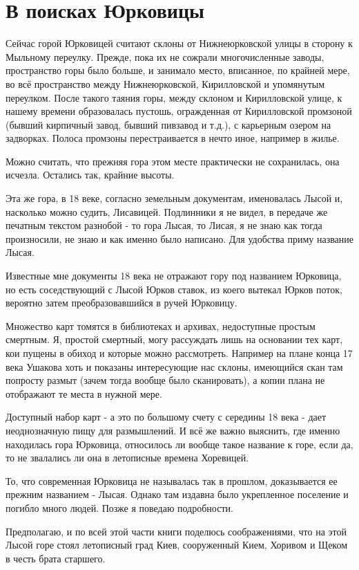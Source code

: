 \chapter{В поисках Юрковицы}

Сейчас горой Юрковицей считают склоны от Нижнеюрковской улицы в сторону к Мыльному переулку. Прежде, пока их не сожрали многочисленные заводы, пространство горы было больше, и занимало место, вписанное, по крайней мере, во всё пространство между Нижнеюрковской, Кирилловской и упомянутым переулком. После такого таяния горы, между склоном и Кирилловской улице, к нашему времени образовалась пустошь, огражденная от Кирилловской промзоной (бывший кирпичный завод, бывший пивзавод и т.д.), с карьерным озером на задворках. Полоса промзоны перестраивается в нечто иное, например в жилье.

Можно считать, что прежняя гора этом месте практически не сохранилась, она исчезла. Остались так, крайние высоты.

Эта же гора, в 18 веке, согласно земельным документам, именовалась Лысой и, насколько можно судить, Лисавицей. Подлинники я не видел, в передаче же печатным текстом разнобой - то гора Лысая, то Лисая, я не знаю как тогда произносили, не знаю и как именно было написано. Для удобства приму название Лысая. 

Известные мне документы 18 века не отражают гору под названием Юрковица, но есть соседствующий с Лысой Юрков ставок, из коего вытекал Юрков поток, вероятно затем преобразовавшийся в ручей Юрковицу.

Множество карт томятся в библиотеках и архивах, недоступные простым смертным. Я, простой смертный, могу рассуждать лишь на основании тех карт, кои пущены в обиход и которые можно рассмотреть. Например на плане конца 17 века Ушакова хоть и показаны интересующие нас склоны, имеющийся скан там попросту размыт (зачем тогда вообще было сканировать), а копии плана не отображают те места в нужной мере.

Доступный набор карт - а это по большому счету с середины 18 века - дает неоднозначную пищу для размышлений. И всё же важно выяснить, где именно находилась гора Юрковица, относилось ли вообще такое название к горе, если да, то не звалались ли она в летописные времена Хоревицей.

То, что современная Юрковица не называлась так в прошлом, доказывается ее прежним названием - Лысая. Однако там издавна было укрепленное поселение и погибло много людей. Позже я поведаю подробности.

Предполагаю, и по всей этой части книги поделюсь соображениями, что на этой Лысой горе стоял летописный град Киев, сооруженный Кием, Хоривом и Щеком в честь брата старшего.

